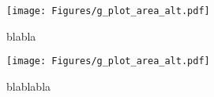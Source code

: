 {
\begin{figure*}[th]
\begin{minipage}{\figWidth}
\begin{center}
\centerline{\texttt{[image: Figures/g\_plot\_area\_alt.pdf]}}
{
blabla
}
\end{center}
\end{minipage}
\begin{minipage}{\figSep}
\hspace{\figSep}
\end{minipage}
\begin{minipage}{\figWidth}
\begin{center}
\centerline{\texttt{[image: Figures/g\_plot\_area\_alt.pdf]}}
{
blablabla
}
\end{center}
\end{minipage}
\end{figure*}
}
